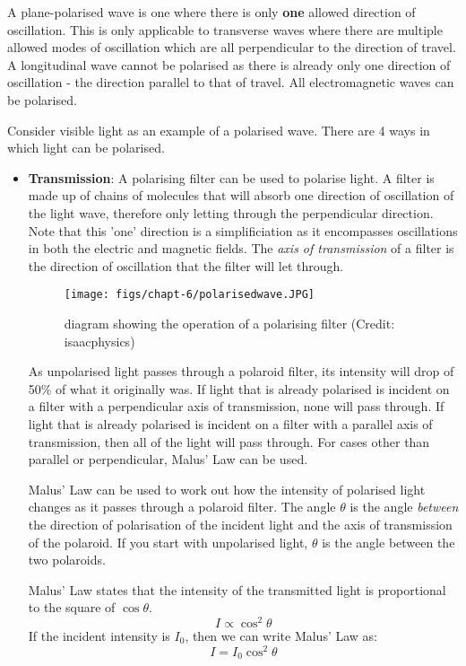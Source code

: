 \documentclass[a4paper,11pt,twoside]{memoir}
\begin{document}
A plane-polarised wave is one where there is only \textbf{one} allowed direction of oscillation. This is only applicable to transverse waves where there are multiple allowed modes of oscillation which are all perpendicular to the direction of travel. A longitudinal wave cannot be polarised as there is already only one direction of oscillation - the direction parallel to that of travel. All electromagnetic waves can be polarised.

Consider visible light as an example of a polarised wave. There are 4 ways in which light can be polarised.

\begin{itemize}
\item\textbf{Transmission}: A polarising filter can be used to polarise light. A filter is made up of chains of molecules that will absorb one direction of oscillation of the light wave, therefore only letting through the perpendicular direction. Note that this 'one' direction is a simplificiation as it encompasses oscillations in both the electric and magnetic fields. The \emph{axis of transmission} of a filter is the direction of oscillation that the filter will let through.

\begin{figure}[h]
\texttt{[image: figs/chapt-6/polarisedwave.JPG]}
\centering
\caption{diagram showing the operation of a polarising filter (Credit: isaacphysics)}
\end{figure}

As unpolarised light passes through a polaroid filter, its intensity will drop of 50\% of what it originally was. If light that is already polarised is incident on a filter with a perpendicular axis of transmission, none will pass through. If light that is already polarised is incident on a filter with a parallel axis of transmission, then all of the light will pass through. For cases other than parallel or perpendicular, Malus' Law can be used.

Malus' Law can be used to work out how the intensity of polarised light changes as it passes through a polaroid filter. The angle $\theta$ is the angle \emph{between} the direction of polarisation of the incident light and the axis of transmission of the polaroid. If you start with unpolarised light, $\theta$ is the angle between the two polaroids.

Malus' Law states that the intensity of the transmitted light is proportional to the square of $\cos\theta$.
$$I \propto \cos^2\theta $$
If the incident intensity is $I_0$, then we can write Malus' Law as:
$$I = I_0\cos^2\theta$$


\end{itemize}
\end{document}
